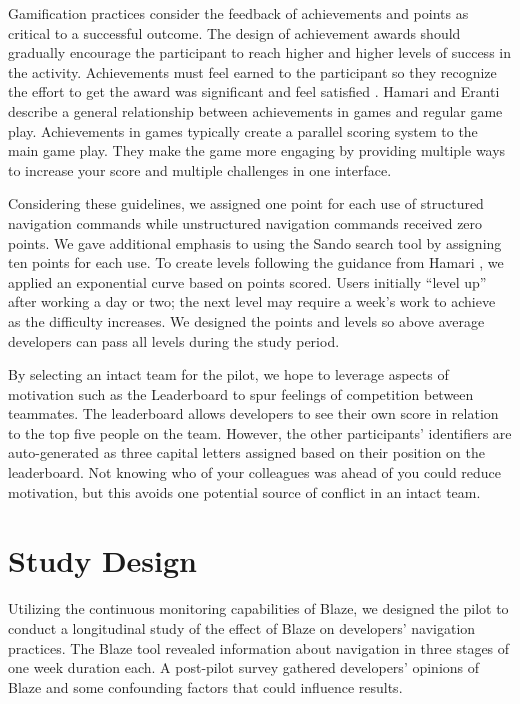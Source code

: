 \documentclass{sig-alternate}
\begin{document}
Gamification practices consider the feedback of achievements and points as critical to a successful outcome.  The design of achievement awards should gradually encourage the participant to reach higher and higher levels of success in the activity.  Achievements must feel earned to the participant so they recognize the effort to get the award was significant and feel satisfied  \cite{wbsnipes:Hamari2011Framework}.  Hamari and Eranti describe a general relationship between achievements in games and regular game play.     Achievements in games typically create a parallel scoring system to the main game play.  They make the game more engaging by providing multiple ways to increase your score and multiple challenges in one interface.

Considering these guidelines, we assigned one point for each use of structured navigation commands while unstructured navigation commands received zero points.    We gave additional emphasis to using the Sando search tool by assigning ten points for each use.  To create levels following the guidance from Hamari \cite{wbsnipes:Hamari2011Framework}, we applied an exponential curve based on points scored.  Users initially ``level up'' after  working a day or two; the next level may require a week's work to achieve as the difficulty increases.  We designed the points and levels so above average developers can pass all levels during the study period.

By selecting an intact team for the pilot, we hope to leverage aspects of motivation such as the Leaderboard to spur feelings of competition between teammates.    The leaderboard allows developers to see their own score in relation to the top five people on the team.  However, the other participants' identifiers are auto-generated as three capital letters assigned based on their position on the leaderboard.  Not knowing who of your colleagues was ahead of you could reduce motivation, but this avoids one potential source of conflict in an intact team.

\section {Study Design}

Utilizing the continuous monitoring capabilities of Blaze, we designed the pilot to conduct a longitudinal study of the effect of Blaze on developers' navigation practices.  The Blaze tool revealed information about navigation in three stages of one week duration each.  A post-pilot survey gathered developers' opinions of Blaze and some confounding factors that could influence results.
\end{document}
